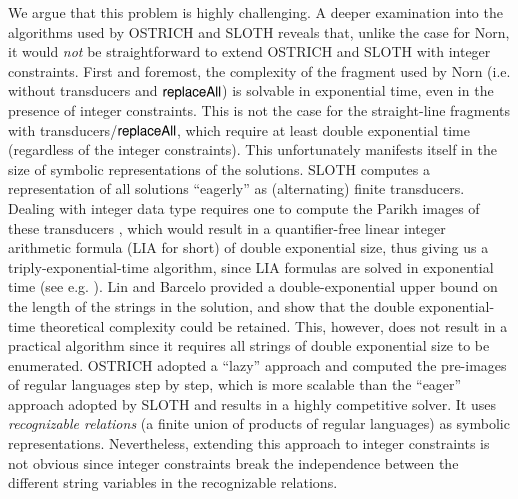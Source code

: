 We argue that this problem is highly challenging.
A deeper examination into the algorithms used by OSTRICH and SLOTH reveals that,
unlike the case for Norn, it would \emph{not} be straightforward to extend OSTRICH and 
SLOTH with integer constraints. First and foremost, the complexity of the
fragment used by Norn (i.e. without transducers and $\mathsf{replaceAll}$) is solvable
in exponential time, even in the presence of integer constraints. This is not
the case for the straight-line fragments with transducers/$\mathsf{replaceAll}$, which 
require at least double exponential time (regardless of the integer constraints).
This unfortunately manifests itself in the size of symbolic representations of 
the solutions. SLOTH \cite{HJLRV18} computes 
a representation of all
solutions ``eagerly'' as (alternating) finite transducers. Dealing with integer data type requires one
to compute the Parikh images of these transducers \cite{LB16}, which would 
result in a
quantifier-free linear integer arithmetic formula (LIA for short) of double exponential size, thus giving us a triply-exponential-time algorithm, since LIA formulas are solved in exponential time  (see e.g. \cite{VSS05}).
Lin and Barcelo \cite{LB16} provided a double-exponential upper bound on the 
length of the strings in the solution, and show that the double
exponential-time theoretical complexity could be retained. This, however, does
not result in a practical algorithm since it requires all strings of double
exponential size to be enumerated. OSTRICH \cite{CHL+19} adopted a ``lazy'' approach and computed the pre-images of regular languages step by step,
which is more scalable than
the ``eager'' approach adopted by SLOTH and results in a highly competitive solver.
It uses \emph{recognizable relations} (a finite union of products of regular languages)
as symbolic representations. Nevertheless, extending this approach to integer
constraints is not obvious since integer constraints break the independence
between the different string variables in the recognizable relations.




